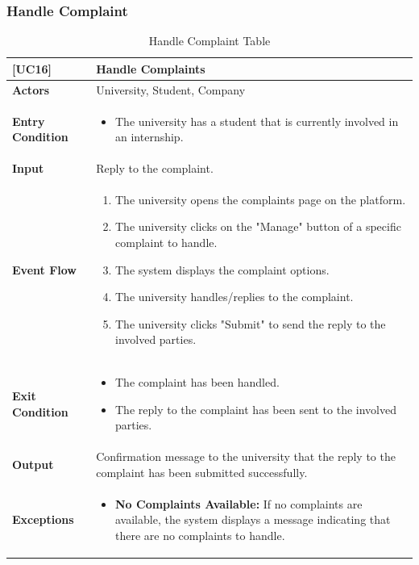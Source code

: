 \subsubsection*{Handle Complaint}
\begin{table}[H]
    \centering
    \renewcommand{\arraystretch}{1.5}
    \begin{tabular}{|p{4cm}|p{11cm}|}
    \hline
    \rowcolor{bluepoli!40}
    \textbf{[UC16]} & \textbf{Handle Complaints} \\ \hline \hline
    \textbf{Actors} & University, Student, Company \\ \hline
    \textbf{Entry Condition} & 
    {\setlength{\leftmargini}{1.1em}
    \begin{itemize}
        \item The university has a student that is currently involved in an internship.
    \end{itemize}} \\ \hline
    \textbf{Input} & Reply to the complaint. \\ \hline
    \textbf{Event Flow} & 
    {\setlength{\leftmargini}{1.4em}
    \begin{enumerate}
        \item The university opens the complaints page on the platform.
        \item The university clicks on the "Manage" button of a specific complaint to handle.
        \item The system displays the complaint options.
        \item The university handles/replies to the complaint.
        \item The university clicks "Submit" to send the reply to the involved parties.
    \end{enumerate}} \\ \hline
    \textbf{Exit Condition} & 
    {\setlength{\leftmargini}{1.1em}
    \begin{itemize}
        \item The complaint has been handled.
        \item The reply to the complaint has been sent to the involved parties.
    \end{itemize}} \\ \hline
    \textbf{Output} & 
    Confirmation message to the university that the reply to the complaint has been submitted successfully. \\ \hline
    \textbf{Exceptions} & 
    {\setlength{\leftmargini}{1.1em}
    \begin{itemize}
        \item \textbf{No Complaints Available:} If no complaints are available, the system displays a message indicating that there are no complaints to handle.
    \end{itemize}} \\ \hline
    \end{tabular}
    \caption{Handle Complaint Table}
\end{table}

